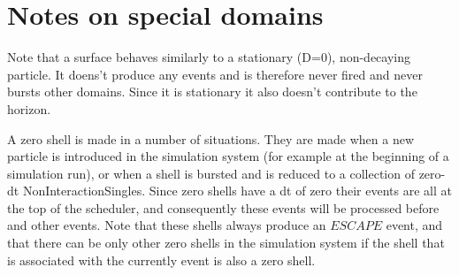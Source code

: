 \documentclass[a4paper,11pt]{article}
\begin{document}
\section{Notes on special domains}
Note that a surface behaves similarly to a stationary (D=0), non-decaying particle. It doens't produce any events and is
therefore never fired and never bursts other domains. Since it is stationary it also doesn't contribute to the horizon.

A zero shell is made in a number of situations. They are made when a new particle is introduced in the simulation system
(for example at the beginning of a simulation run), or when a shell is bursted and is reduced to a collection of zero-dt
NonInteractionSingles.
Since zero shells have a dt of zero their events are all at the top of the
scheduler, and consequently these events will be processed before and other events. Note that these shells always produce
an $ESCAPE$ event, and that there can be only other zero shells in the simulation system if the shell that is associated with
the currently event is also a zero shell.
\end{document}
